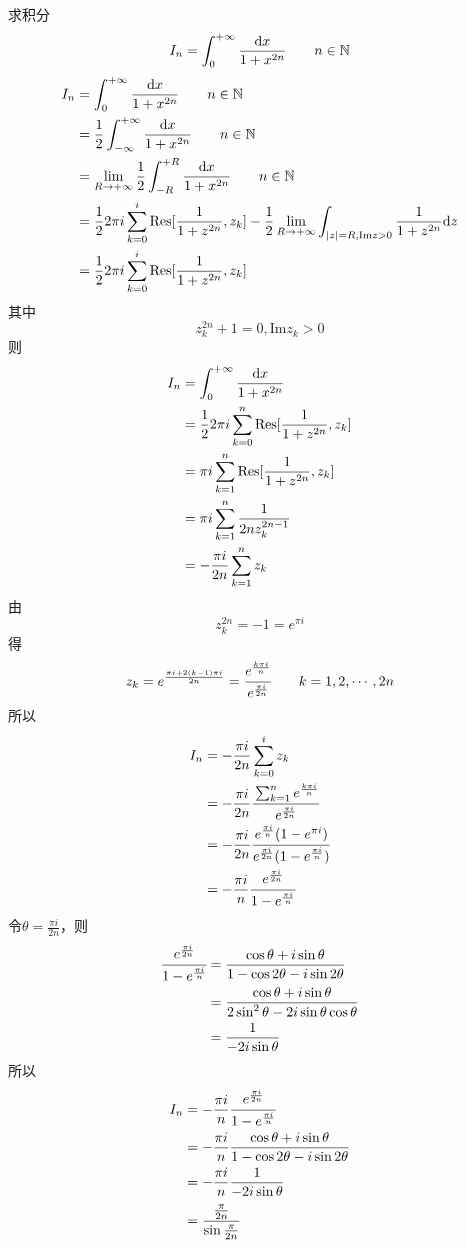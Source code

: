 \begin{homeworkProblem}
    求积分
    \[
    I_{n} = \int_0^{+\infty}\frac{\mathrm{d}x}{1+x^{2n}}\qquad n\in\mathbb{N}
    \]
\solution
\[\begin{split}
I_{n} &= \int_0^{+\infty}\frac{\mathrm{d}x}{1+x^{2n}}\qquad n\in\mathbb{N}\\
&= \frac{1}{2}\int_{-\infty}^{+\infty}\frac{\mathrm{d}x}{1+x^{2n}}\qquad n\in\mathbb{N}\\
&= \lim_{R\rightarrow+\infty}\frac{1}{2}\int_{-R}^{+R}\frac{\mathrm{d}x}{1+x^{2n}}\qquad n\in\mathbb{N}\\
&= \frac{1}{2}2\pi i\sum_{k=0}^{i}\mathrm{Res}[\frac{1}{1+z^{2n}}, z_k] - \frac{1}{2}\lim_{R\rightarrow+\infty}\int_{|z|=R, \mathrm{Im}z>0}\frac{1}{1+z^{2n}}\mathrm{d}z\\
&=\frac{1}{2}2\pi i\sum_{k=0}^{i}\mathrm{Res}[\frac{1}{1+z^{2n}}, z_k]
\end{split}\]
其中
\[z_k^{2n}+1=0, \mathrm{Im}z_k>0\]
则
\[\begin{split}
I_n &= \int_0^{+\infty}\frac{\mathrm{d}x}{1+x^{2n}}\\
&= \frac{1}{2}2\pi i\sum_{k=0}^{n}\mathrm{Res}[\frac{1}{1+z^{2n}}, z_k] \\
&= \pi i\sum_{k=1}^{n}\mathrm{Res}[\frac{1}{1+z^{2n}}, z_k]\\
&= \pi i\sum_{k=1}^{n}\frac{1}{2nz_k^{2n-1}}\\
&= -\frac{\pi i}{2n}\sum_{k=1}^{n}z_k
\end{split}\]
由\[z_k^{2n}=-1=e^{\pi i}\]得\[z_k=e^\frac{\pi i+2(k-1)\pi i}{2n}=\cfrac {e^{\frac{k\pi i}{n}}} {e^{\frac{\pi i}{2n}}} \qquad k=1,2,\cdots,2n\]
所以
\[\begin{split}
I_n &= -\frac{\pi i}{2n}\sum_{k=0}^{i}z_k \\
&= -\frac{\pi i}{2n}\cfrac{\sum_{k=1}^{n}e^{\frac{k\pi i}{n}}}{e^{\frac{\pi i}{2n}}}\\
&= -\frac{\pi i}{2n}\cfrac{e^{\frac{\pi i}{n}}(1-e^{\pi i})}{e^{\frac{\pi i}{2n}}(1-e^{\frac{\pi i}{n}})}\\
&=-\frac{\pi i}{n}\cfrac{e^{\frac{\pi i}{2n}}}{1-e^{\frac{\pi i}{n}}}
\end{split}\]
令$\theta=\frac{\pi i}{2n}$，则
\[\begin{split}
\cfrac{e^{\frac{\pi i}{2n}}}{1-e^{\frac{\pi i}{n}}}
&= \frac{\cos\theta + i\sin\theta}{1-\cos2\theta-i\sin2\theta}\\
&= \frac{\cos\theta + i\sin\theta}{2\sin^2\theta-2i\sin\theta\cos\theta}\\
&= \frac{1}{-2i\sin\theta}
\end{split}\]
所以
\[\begin{split}
I_n &= -\frac{\pi i}{n}\cfrac{e^{\frac{\pi i}{2n}}}{1-e^{\frac{\pi i}{n}}}\\
&= -\frac{\pi i}{n}\frac{\cos\theta + i\sin\theta}{1-\cos2\theta-i\sin2\theta}\\
&=-\frac{\pi i}{n}\frac{1}{-2i\sin\theta}\\
&= \cfrac{\frac{\pi}{2n}}{\sin\frac{\pi}{2n}}
\end{split}\]
\end{homeworkProblem}
